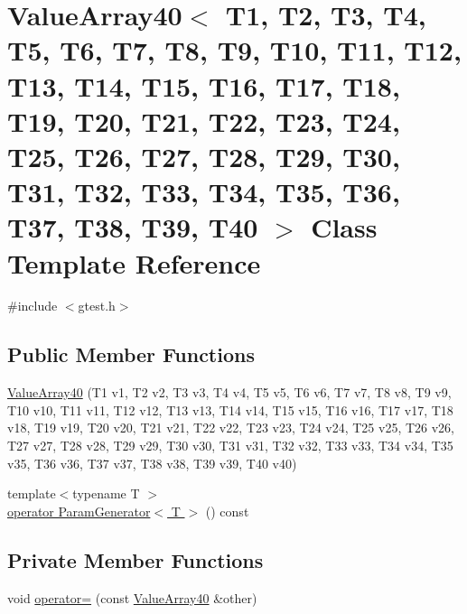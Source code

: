 \hypertarget{classtesting_1_1internal_1_1ValueArray40}{\section{\-Value\-Array40$<$ \-T1, \-T2, \-T3, \-T4, \-T5, \-T6, \-T7, \-T8, \-T9, \-T10, \-T11, \-T12, \-T13, \-T14, \-T15, \-T16, \-T17, \-T18, \-T19, \-T20, \-T21, \-T22, \-T23, \-T24, \-T25, \-T26, \-T27, \-T28, \-T29, \-T30, \-T31, \-T32, \-T33, \-T34, \-T35, \-T36, \-T37, \-T38, \-T39, \-T40 $>$ \-Class \-Template \-Reference}
\label{d0/d53/classtesting_1_1internal_1_1ValueArray40}
}


{\ttfamily \#include $<$gtest.\-h$>$}

\subsection*{\-Public \-Member \-Functions}
\begin{DoxyCompactItemize}
\item 
\hyperlink{classtesting_1_1internal_1_1ValueArray40_a609146d95c6b0e5ffdcd14ceb4431a8c}{\-Value\-Array40} (\-T1 v1, \-T2 v2, \-T3 v3, \-T4 v4, \-T5 v5, \-T6 v6, \-T7 v7, \-T8 v8, \-T9 v9, \-T10 v10, \-T11 v11, \-T12 v12, \-T13 v13, \-T14 v14, \-T15 v15, \-T16 v16, \-T17 v17, \-T18 v18, \-T19 v19, \-T20 v20, \-T21 v21, \-T22 v22, \-T23 v23, \-T24 v24, \-T25 v25, \-T26 v26, \-T27 v27, \-T28 v28, \-T29 v29, \-T30 v30, \-T31 v31, \-T32 v32, \-T33 v33, \-T34 v34, \-T35 v35, \-T36 v36, \-T37 v37, \-T38 v38, \-T39 v39, \-T40 v40)
\item 
{\footnotesize template$<$typename T $>$ }\\\hyperlink{classtesting_1_1internal_1_1ValueArray40_a08ef46fa12c9dd8ef6fc630baeea89b7}{operator Param\-Generator$<$ T $>$} () const 
\end{DoxyCompactItemize}
\subsection*{\-Private \-Member \-Functions}
\begin{DoxyCompactItemize}
\item 
void \hyperlink{classtesting_1_1internal_1_1ValueArray40_ac9dc38afe3f46a1486349845c6b128c2}{operator=} (const \hyperlink{classtesting_1_1internal_1_1ValueArray40}{\-Value\-Array40} \&other)
\end{DoxyCompactItemize}
